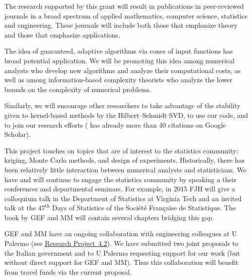 \documentclass[11pt]{NSFamsart}
\newcommand{\refprobdb}{\hyperref[SectMEEG]{Research Project~4.2}\xspace}
\begin{document}
\begin{description}[leftmargin=0ex]
\item[Disseminating Research]
The research supported by this grant will result in publications in peer-reviewed journals in a broad spectrum of applied mathematics, computer science, statistics and engineering. These journals will include both those that emphasize theory and those that emphasize applications.

\item[Promoting Cones] The idea of guaranteed, adaptive algorithms via cones of input functions has broad potential application.  We will be promoting this idea among numerical analysts who develop new algorithms and analyze their computational costs, as well as among information-based complexity theorists who analyze the lower bounds on the complexity of numerical problems.

\item[Promoting the Hilbert--Schmidt SVD] Similarly, we will encourage other researchers to take advantage of the stability given to kernel-based methods by the Hilbert--Schmidt SVD, to use our code, and to join our research efforts (\citep{FMcC12} has already more than 40 citations on Google Scholar).

\item[Bridging Mathematics and Statistics]
This project touches on topics that are of interest to the statistics community: kriging, Monte Carlo methods, and design of experiments.  Historically, there has been relatively little interaction between numerical analysts and statisticians.  We have and will continue to engage the statistics community by speaking a their conferences and departmental seminars.  For example, in 2015 FJH will give a colloquium talk in the Department of Statistics at Virginia Tech and an invited talk at the $47^{\text{th}}$ Days of Statistics of the Soci\'et\'e Fran\c{c}aise de Statistique. The book \citep{FMcC15} by GEF and MM will contain several chapters bridging this gap.

\item[Collaborating with Engineers]
GEF and MM have an ongoing collaboration with engineering colleagues at U Palermo (see \refprobdb). We have submitted two joint proposals to the Italian government and to U Palermo requesting support for our work (but without direct support for GEF and MM). Thus this collaboration will benefit from travel funds via the current proposal.


\end{description}
\end{document}
